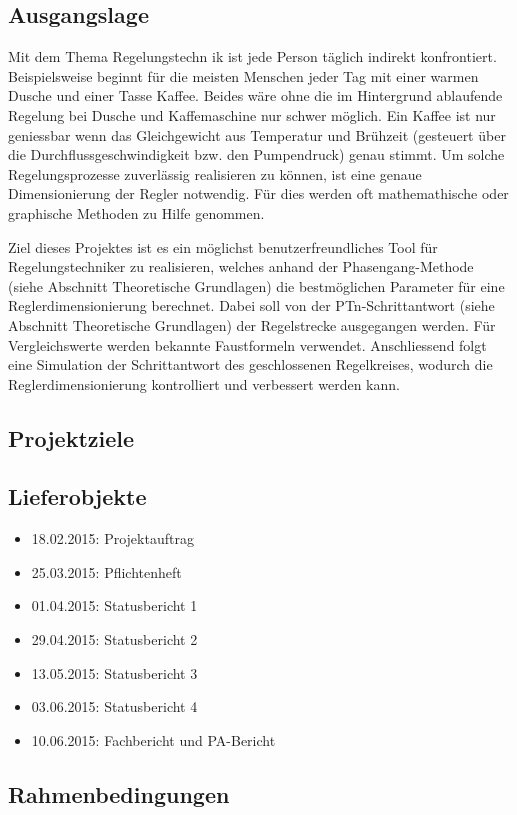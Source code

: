 \subsection{Ausgangslage}
Mit   dem  Thema   Regelungstechn ik  ist  jede   Person  t\"aglich   indirekt
konfrontiert. Beispielsweise beginnt f\"ur die  meisten Menschen jeder Tag mit
einer  warmen  Dusche  und  einer  Tasse Kaffee. Beides  w\"are  ohne  die  im
Hintergrund  ablaufende  Regelung  bei  Dusche und  Kaffemaschine  nur  schwer
m\"oglich. Ein Kaffee ist nur geniessbar wenn das Gleichgewicht aus Temperatur
und  Br\"uhzeit  (gesteuert \"uber  die  Durchflussgeschwindigkeit  bzw.  den
Pumpendruck) genau stimmt.
Um solche Regelungsprozesse zuverlässig realisieren zu können, ist eine genaue
Dimensionierung der Regler notwendig. Für dies werden oft mathemathische
oder graphische Methoden zu Hilfe genommen.

Ziel  dieses  Projektes  ist  es  ein  m\"oglichst  benutzerfreundliches  Tool
f\"ur Regelungstechniker zu realisieren,  welches anhand der Phasengang-Methode
(siehe Abschnitt  Theoretische Grundlagen) die bestmöglichen  Parameter f\"ur eine
Reglerdimensionierung berechnet. Dabei soll  von der PTn-Schrittantwort (siehe
Abschnitt Theoretische Grundlagen) der Regelstrecke ausgegangen werden.  F\"ur
Vergleichswerte  werden bekannte  Faustformeln verwendet. Anschliessend  folgt
eine Simulation der Schrittantwort des geschlossenen Regelkreises, wodurch die
Reglerdimensionierung kontrolliert und verbessert werden kann.


\clearpage
\subsection{Projektziele}

\clearpage
\subsection{Lieferobjekte}

\begin{itemize}
    \item{18.02.2015}: Projektauftrag
    \item{25.03.2015}: Pflichtenheft
    \item{01.04.2015}: Statusbericht 1
    \item{29.04.2015}: Statusbericht 2
    \item{13.05.2015}: Statusbericht 3
    \item{03.06.2015}: Statusbericht 4
    \item{10.06.2015}: Fachbericht und PA-Bericht
\end{itemize}

\clearpage
\subsection{Rahmenbedingungen}
